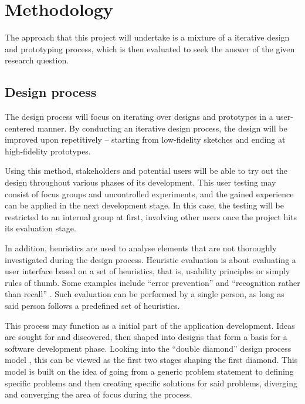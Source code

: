 \chapter{Methodology}
\label{ch:methodology}

The approach that this project will undertake is a mixture of a iterative design and prototyping process, which is then evaluated to seek the answer of the given research question.

\section{Design process}
\label{sec:designprocess}

The design process will focus on iterating over designs and prototypes in a user-centered manner. By conducting an iterative design process, the design will be improved upon repetitively -- starting from low-fidelity sketches and ending at high-fidelity prototypes.

Using this method, stakeholders and potential users will be able to try out the design throughout various phases of its development. This user testing may consist of focus groups and uncontrolled experiments, and the gained experience can be applied in the next development stage. In this case, the testing will be restricted to an internal group at first, involving other users once the project hits its evaluation stage.

In addition, heuristics are used to analyse elements that are not thoroughly investigated during the design process. Heuristic evaluation is about evaluating a user interface based on a set of heuristics, that is, usability principles or simply rules of thumb. Some examples include \enquote{error prevention} and \enquote{recognition rather than recall} \parencite{nilsen1994}. Such evaluation can be performed by a single person, as long as said person follows a predefined set of heuristics.

This process may function as a initial part of the application development. Ideas are sought for and discovered, then shaped into designs that form a basis for a software development phase. Looking into the \enquote{double diamond} design process model \parencite{designcouncil2007}, this can be viewed as the first two stages shaping the first diamond. This model is built on the idea of going from a generic problem statement to defining specific problems and then creating specific solutions for said problems, diverging and converging the area of focus during the process.

